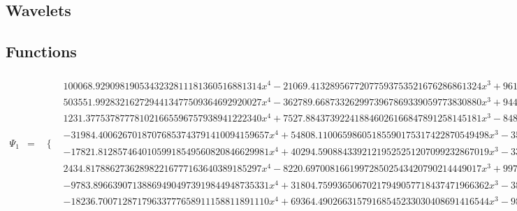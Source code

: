\documentclass{article}
\begin{document}
 \begin{landscape}
\section{Wavelets}
\subsection{Functions}
 \begin{eqnarray*}
\Psi_1 & = & \begin{array}{cc}
 \{ & 
\begin{array}{cc}
 100068.9290981905343232811181360516881314 x^4-21069.41328956772077593753521676286861324 x^3+961.4945176673466699136825663235012381816 x^2 & x\geq 0\land x<\frac{1}{8} \\
 503551.9928321627294413477509364692920027 x^4-362789.6687332629973967869339059773830880 x^3+94491.64426637313901865635638432131689298 x^2-10516.61189867488976994324845969578607794 x+422.0836640673737474951515243470900346495 & x\geq \frac{1}{8}\land x<\frac{1}{4} \\
 1231.377537877781021665596757938941222340 x^4+7527.884373922418846026166847891258145181 x^3-8482.850469244086286664020564313871334840 x^2+2931.132717429266613419618259429584728520 x-327.9684327890603157926128806638667392592 & x\geq \frac{1}{4}\land x<\frac{3}{8} \\
 -31984.40062670187076853743791410094159657 x^4+54808.11006598605185590175317422870549498 x^3-35005.19710404907998582473570382536744263 x^2+9883.000686284687011244844258773008990777 x-1041.652089202400719960009377901790574212 & x\geq \frac{3}{8}\land x<\frac{1}{2} \\
 -17821.81285746401059918549560820846629981 x^4+40294.59088433921219525251207099232867019 x^3-33996.65628253238997083651820537212723930 x^2+12678.30536638419665706758643480081375766 x-1762.411472502839349621776096742735611434 & x\geq \frac{1}{2}\land x<\frac{5}{8} \\
 2434.817886273628982216777163640389185297 x^4-8220.697008166199728502543420790214449017 x^3+9979.903166174761927224006563001894186134 x^2-5220.406906151252271070770874992693240981 x+999.5763149553377510901355470682878448270 & x\geq \frac{5}{8}\land x<\frac{3}{4} \\
 -9783.896639071388694904973919844948735331 x^4+31804.75993650670217949057718437471966362 x^3-38586.22961714399153581071893876741959528 x^2+20704.91443621107328388588130982695885712 x-4145.627006948541085203114198346136104025 & x\geq \frac{3}{4}\land x<\frac{7}{8} \\
 -18236.70071287179633777658911158811891110 x^4+69364.49026631579168545233030408691416544 x^3-98826.19347560422079187754908071028400529 x^2+62505.71900374825187850446369551230115866 x-14807.31508158802643430265580730081240771 & x\geq \frac{7}{8}\land x<1
\end{array}


\end{array}
\end{eqnarray*}
\end{landscape}
\end{document}
